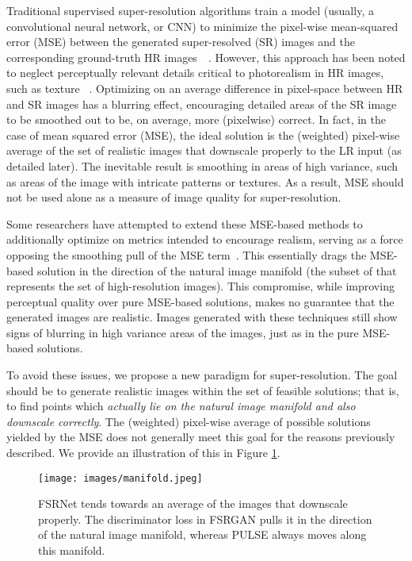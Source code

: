 \documentclass[10pt,twocolumn,letterpaper]{article}
\begin{document}
Traditional supervised super-resolution algorithms train a model (usually, a convolutional neural network, or CNN) to minimize the pixel-wise mean-squared error (MSE) between the generated super-resolved (SR) images and the corresponding ground-truth HR images~\cite{VDSR}~\cite{chen2018fsrnet}. However, this approach has been noted to neglect perceptually relevant details critical to photorealism in HR images, such as texture ~\cite{SRGAN}. Optimizing on an average difference in pixel-space between HR and SR images has a blurring effect, encouraging detailed areas of the SR image to be smoothed out to be, on average, more (pixelwise) correct. In fact, in the case of mean squared error (MSE), the ideal solution is the (weighted) pixel-wise average of the set of realistic images that downscale properly to the LR input (as detailed later). The inevitable result is smoothing in areas of high variance, such as areas of the image with intricate patterns or textures. As a result, MSE should not be used alone as a measure of image quality for super-resolution.

Some researchers have attempted to extend these MSE-based methods to additionally optimize on metrics intended to encourage realism, serving as a force opposing the smoothing pull of the MSE term~\cite{SRGAN,chen2018fsrnet}. This essentially drags the MSE-based solution in the direction of the natural image manifold (the subset of  that represents the set of high-resolution images). This compromise, while improving perceptual quality over pure MSE-based solutions, makes no guarantee that the generated images are realistic. Images generated with these techniques still show signs of blurring in high variance areas of the images, just as in the pure MSE-based solutions.

To avoid these issues, we propose a new paradigm for super-resolution. The goal should be to generate realistic images within the set of feasible solutions; that is, to find points which \textit{actually lie on the natural image manifold and also downscale correctly}. The (weighted) pixel-wise average of possible solutions yielded by the MSE does not generally meet this goal for the reasons previously described. We provide an illustration of this in Figure \ref{fig:manifold}.

\begin{figure}[!t]
    \centering
    \texttt{[image: images/manifold.jpeg]}
    \caption{FSRNet tends towards an average of the images that downscale properly. The discriminator loss in FSRGAN pulls it in the direction of the natural image manifold, whereas PULSE always moves along this manifold.}
    \label{fig:manifold}
\end{figure}
\end{document}
